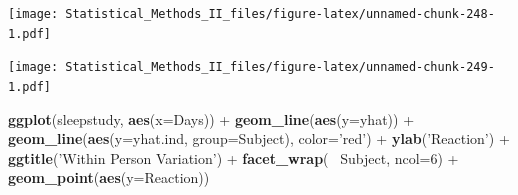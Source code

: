 \documentclass[]{book}
\newenvironment{Shaded}{\begin{snugshade}}{\end{snugshade}}
\newcommand{\KeywordTok}[1]{\textcolor[rgb]{0.13,0.29,0.53}{\textbf{{#1}}}}
\newcommand{\DataTypeTok}[1]{\textcolor[rgb]{0.13,0.29,0.53}{{#1}}}
\newcommand{\DecValTok}[1]{\textcolor[rgb]{0.00,0.00,0.81}{{#1}}}
\newcommand{\StringTok}[1]{\textcolor[rgb]{0.31,0.60,0.02}{{#1}}}
\newcommand{\NormalTok}[1]{{#1}}
\theoremstyle{definition}
\theoremstyle{definition}
\theoremstyle{remark}
\begin{document}
\texttt{[image: Statistical\_Methods\_II\_files/figure-latex/unnamed-chunk-248-1.pdf]}

\begin{Shaded}
\end{Shaded}

\texttt{[image: Statistical\_Methods\_II\_files/figure-latex/unnamed-chunk-249-1.pdf]}

\begin{Shaded}
\begin{Highlighting}[]
\KeywordTok{ggplot}\NormalTok{(sleepstudy, }\KeywordTok{aes}\NormalTok{(}\DataTypeTok{x=}\NormalTok{Days)) +}
\StringTok{  }\KeywordTok{geom_line}\NormalTok{(}\KeywordTok{aes}\NormalTok{(}\DataTypeTok{y=}\NormalTok{yhat)) +}\StringTok{ }
\StringTok{  }\KeywordTok{geom_line}\NormalTok{(}\KeywordTok{aes}\NormalTok{(}\DataTypeTok{y=}\NormalTok{yhat.ind, }\DataTypeTok{group=}\NormalTok{Subject), }\DataTypeTok{color=}\StringTok{'red'}\NormalTok{) +}
\StringTok{  }\KeywordTok{ylab}\NormalTok{(}\StringTok{'Reaction'}\NormalTok{) +}\StringTok{ }\KeywordTok{ggtitle}\NormalTok{(}\StringTok{'Within Person Variation'}\NormalTok{) +}
\StringTok{  }\KeywordTok{facet_wrap}\NormalTok{(~}\StringTok{ }\NormalTok{Subject, }\DataTypeTok{ncol=}\DecValTok{6}\NormalTok{) +}\StringTok{ }
\StringTok{  }\KeywordTok{geom_point}\NormalTok{(}\KeywordTok{aes}\NormalTok{(}\DataTypeTok{y=}\NormalTok{Reaction))}
\end{Highlighting}
\end{Shaded}
\end{document}
